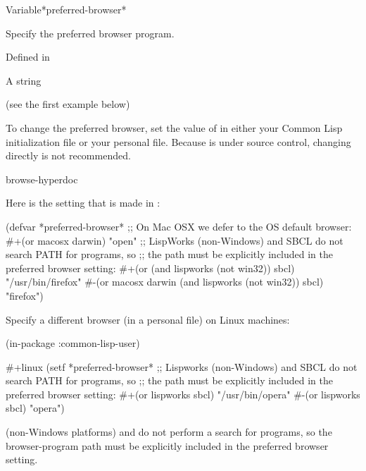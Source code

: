 \documentclass[10pt,twoside,english,pdftex]{article}
\begin{document}

\begin{functiondoc}{Variable}{*preferred-browser*}{}%

\fnsyntax

\fnpurpose Specify the preferred browser program.

\fnpackage {}

\fnmodule Defined in 

\fnvaluetype A string

\fninitialvalue (see the first example below)

\fndescription To change the preferred browser, set the value of
 in either your Common Lisp initialization
file or your personal  file.  Because
 is under
 source control, changing
 directly is not recommended.

\begin{alsos}{browse-hyperdoc}
\end{alsos}

\fnexamples
Here is the setting that is made in :
%
\W\supp
\begin{example}
  (defvar *preferred-browser* 
      ;; On Mac OSX we defer to the OS default browser:
      #+(or macosx darwin)
      "open"
      ;; LispWorks (non-Windows) and SBCL do not search PATH for programs, so
      ;; the path must be explicitly included in the preferred browser setting:
      #+(or (and lispworks (not win32)) sbcl) "/usr/bin/firefox"
      #-(or macosx darwin (and lispworks (not win32)) sbcl) "firefox")
\end{example}

Specify a different browser (in a personal 
file) on Linux machines:
%
\W\supp
\begin{example}
  (in-package :common-lisp-user)

  #+linux
  (setf *preferred-browser* 
    ;; Lispworks (non-Windows) and SBCL do not search PATH for programs, so
    ;; the path must be explicitly included in the preferred browser setting:
     #+(or lispworks sbcl) "/usr/bin/opera"
     #-(or lispworks sbcl) "opera")
\end{example}

\fnnote {} (non-Windows
platforms) and  do not perform a
 search for programs, so the browser-program path must be explicitly
included in the preferred browser setting.

\end{functiondoc}
\end{document}
